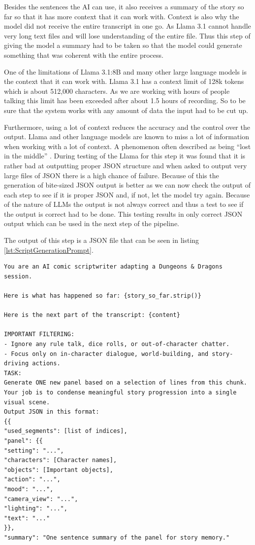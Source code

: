 Besides the sentences the AI can use, it also receives a summary of the story so far so that it has more context that it can work with. Context is also why the model did not receive the entire transcript in one go. As Llama 3.1 cannot handle very long text files and will lose understanding of the entire file. Thus this step of giving the model a summary had to be taken so that the model could generate something that was coherent with the entire process.

One of the limitations of Llama 3.1:8B and many other large language models is the context that it can work with. Llama 3.1 has a context limit of 128k tokens which is about 512,000 characters. As we are working with hours of people talking this limit has been exceeded after about 1.5 hours of recording. So to be sure that the system works with any amount of data the input had to be cut up. 

Furthermore, using a lot of context reduces the accuracy and the control over the output. Llama and other language models are known to miss a lot of information when working with a lot of context. A phenomenon often described as being “lost in the middle” \cite{liu2023lostmiddlelanguagemodels}. During testing of the Llama for this step it was found that it is rather bad at outputting proper JSON structure and when asked to output very large files of JSON there is a high chance of failure. Because of this the generation of bite-sized JSON output is better as we can now check the output of each step to see if it is proper JSON and, if not, let the model try again. Because of the nature of LLMs the output is not always correct and thus a test to see if the output is correct had to be done. This testing results in only correct JSON output which can be used in the next step of the pipeline.

The output of this step is a JSON file that can be seen in listing \ref{lst:ScriptGenerationPrompt}.

\begin{lstlisting}[style=jsonstyle, caption={Prompt for Comic Book Script Generation}, label={lst:ScriptGenerationPrompt}]
You are an AI comic scriptwriter adapting a Dungeons & Dragons session.

Here is what has happened so far: {story_so_far.strip()}

Here is the next part of the transcript: {content}

IMPORTANT FILTERING:
- Ignore any rule talk, dice rolls, or out-of-character chatter.
- Focus only on in-character dialogue, world-building, and story-driving actions.
TASK:
Generate ONE new panel based on a selection of lines from this chunk. Your job is to condense meaningful story progression into a single visual scene.
Output JSON in this format:
{{
"used_segments": [list of indices],
"panel": {{
"setting": "...",
"characters": [Character names],
"objects": [Important objects],
"action": "...",
"mood": "...",
"camera_view": "...",
"lighting": "...",
"text": "..."
}},
"summary": "One sentence summary of the panel for story memory."
\end{lstlisting}

